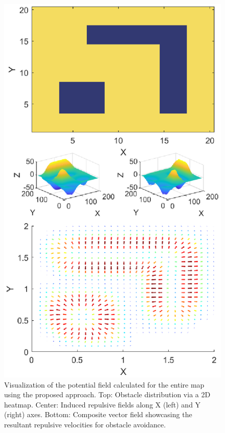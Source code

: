 \documentclass[letterpaper, 10 pt, conference]{ieeeconf}  %
\begin{document}
\begin{figure}
	\centering
	\includegraphics[width=1\linewidth]{demo-field1c.eps} %
	\caption{Visualization of the potential field calculated for the entire map using the proposed approach. Top: Obstacle distribution via a 2D heatmap. Center: Induced repulsive fields along X (left) and Y (right) axes. Bottom: Composite vector field showcasing the resultant repulsive velocities for obstacle avoidance.}
	\label{fig:example-field}
\end{figure}
\end{document}
